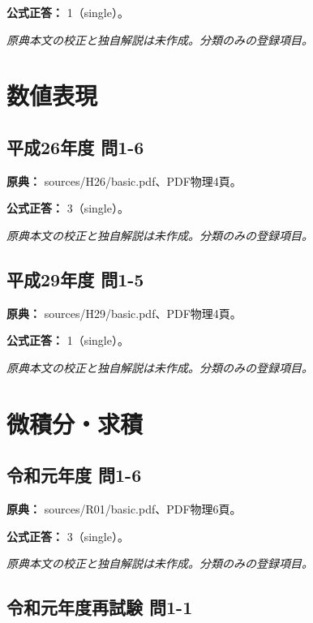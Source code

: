 \textbf{公式正答：} 1（single）。

\par\textit{原典本文の校正と独自解説は未作成。分類のみの登録項目。}

\section{数値表現}

\subsection{平成26年度 問1-6}
\label{q:h26-reg-basic-1-6}

\noindent\textbf{原典：} sources/H26/basic.pdf、PDF物理4頁。

\textbf{公式正答：} 3（single）。

\par\textit{原典本文の校正と独自解説は未作成。分類のみの登録項目。}

\subsection{平成29年度 問1-5}
\label{q:h29-reg-basic-1-5}

\noindent\textbf{原典：} sources/H29/basic.pdf、PDF物理4頁。

\textbf{公式正答：} 1（single）。

\par\textit{原典本文の校正と独自解説は未作成。分類のみの登録項目。}

\section{微積分・求積}

\subsection{令和元年度 問1-6}
\label{q:r01-reg-basic-1-6}

\noindent\textbf{原典：} sources/R01/basic.pdf、PDF物理6頁。

\textbf{公式正答：} 3（single）。

\par\textit{原典本文の校正と独自解説は未作成。分類のみの登録項目。}

\subsection{令和元年度再試験 問1-1}
\label{q:r01-ret-basic-1-1}

